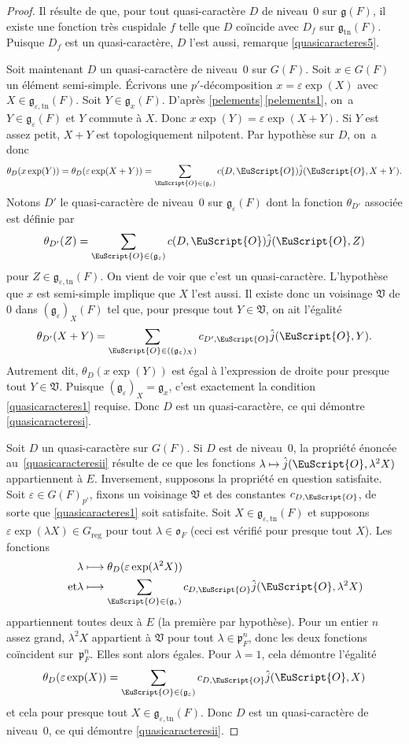 \documentclass[JEP,XML,SOM,Unicode,francais]{cedram}
\let\mathcal \EuScript
\newcommand{\NoChangel}[1]{%
\expandafter\let\csname old\string#1\endcsname=#1
\let#1=\relax
\newcommand{#1}{\mathcode`l="716C\csname old\string#1\endcsname\mathcode`l="7160 }%
}
\let\epsilon\varepsilon
\newcommand\mto{\mathchoice{\longmapsto}{\mapsto}{\mapsto}{\mapsto}}
\newcommand{\frg}{\mathfrak{g}}
\newcommand{\fro}{\mathfrak{o}}
\newcommand{\frp}{\mathfrak{p}}
\newcommand{\frV}{\mathfrak{V}}
\newcommand{\Nil}{\mathrm{Nil}} \NoChangel{\Nil}
\newcommand{\reg}{\mathrm{reg}}
\newcommand{\tn}{\mathrm{tn}}
\newcommand{\cO}{\mathcal{O}}
\theoremstyle{plain}
\theoremstyle{definition}
\begin{document}
\begin{proof}
Il résulte de \cite[Lem.\,6.3(iii)]{W1} que, pour tout quasi-caractère $D$ de niveau~$0$ sur $\frg(F)$, il existe une fonction très cuspidale $f$ telle que $D$ coïncide avec $D_{f}$ sur $\frg_{\tn}(F)$. Puisque $D_{f}$ est un quasi-caractère, $D$ l'est aussi, \cf remarque \eqref{quasicaracteres5}.

Soit maintenant $D$ un quasi-caractère de niveau~$0$ sur $G(F)$. Soit $x\in G(F)$ un élément semi-simple. Écrivons une $p'$-décomposition $x=\epsilon \exp(X)$ avec $X\in \frg_{\epsilon,\tn}(F)$. Soit $Y\in \frg_{x}(F)$. D'après \ref{pelements}\,\eqref{pelements1}, on~a $Y\in \frg_{\epsilon}(F)$ et $Y$ commute à $X$. Donc $x\exp(Y)=\epsilon \exp(X+Y)$. Si $Y$ est assez petit, $X+Y$ est topologiquement nilpotent. Par hypothèse sur $D$, on~a donc
\[
\theta_{D}(x \exp(Y))=\theta_{D}(\epsilon \exp(X+Y))=\sum_{\cO\in \Nil(\frg_{\epsilon})}c(D,\cO)\hat{j}(\cO,X+Y).
\]
Notons $D'$ le quasi-caractère de niveau~$0$ sur $\frg_{\epsilon}(F)$ dont la fonction $\theta_{D'}$ associée est définie par
\[
\theta_{D'}(Z)= \sum_{\cO\in \Nil(\frg_{\epsilon})}c(D,\cO)\hat{j}(\cO,Z)
\]
pour $Z\in \frg_{\epsilon,\tn}(F)$. On vient de voir que c'est un quasi-caractère. L'hypothèse que $x$ est semi-simple implique que $X$ l'est aussi. Il existe donc un voisinage $\frV$ de $0$ dans $(\frg_{\epsilon})_{X}(F)$ tel que, pour presque tout $Y\in \frV$, on ait l'égalité
\[
\theta_{D'}(X+Y)=\sum_{\cO\in \Nil((\frg_{\epsilon})_{X})}c_{D',\cO}\hat{j}(\cO,Y).
\]
Autrement dit, $\theta_{D}(x \exp(Y))$ est égal à l'expression de droite pour presque tout \hbox{$Y\!\in\!\frV$}. Puisque $(\frg_{\epsilon})_{X}=\frg_{x}$, c'est exactement la condition \eqref{quasicaracteres1} requise. Donc $D$ est un quasi-caractère, ce qui démontre \eqref{quasicaracteresi}.

Soit $D$ un quasi-caractère sur $G(F)$. Si $D$ est de niveau~$0$, la propriété énoncée au~\eqref{quasicaracteresii} résulte de ce que les fonctions $\lambda\mto \hat{j}(\cO,\lambda^2X)$ appartiennent à $E$. Inversement, supposons la propriété en question satisfaite. Soit $\epsilon\in G(F)_{p'}$, fixons un voisinage $\frV$ et des constantes $c_{D,\cO}$, de sorte que \eqref{quasicaracteres1} soit satisfaite. Soit $X\in \frg_{\epsilon,\tn}(F)$ et supposons $\epsilon \exp(\lambda X)\in G_{\reg}$ pour tout $\lambda\in \fro_{F}$ (ceci est vérifié pour presque tout $X$). Les fonctions
\begin{align*}
\lambda&\mto \theta_{D}(\epsilon \exp(\lambda^2X))
\\
\tag*{et}
\lambda&\mto \sum_{\cO\in \Nil(\frg_{\epsilon})}c_{D,\cO}\hat{j}(\cO,\lambda^2X)
\end{align*}
appartiennent toutes deux à $E$ (la première par hypothèse). Pour un entier $n$ assez grand, $\lambda^2 X$ appartient à $\frV$ pour tout $\lambda\in \frp_{F}^n$, donc les deux fonctions coïncident sur~$\frp_{F}^n$. Elles sont alors égales. Pour $\lambda=1$, cela démontre l'égalité
\[
\theta_{D}(\epsilon \exp(X))=\sum_{\cO\in \Nil(\frg_{\epsilon})}c_{D,\cO}\hat{j}(\cO,X)
\]
et cela pour presque tout $X\in \frg_{\epsilon,\tn}(F)$. Donc $D$ est un quasi-caractère de niveau~$0$, ce qui démontre \eqref{quasicaracteresii}.


\end{proof}
\end{document}
